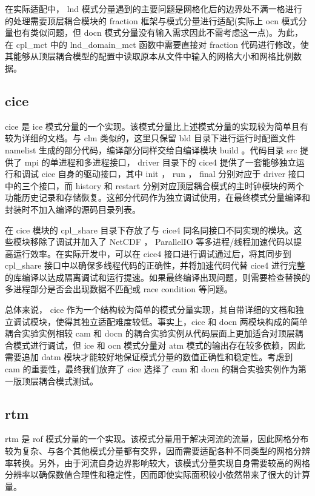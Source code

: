 在实际适配中， lnd 模式分量遇到的主要问题是网格化后的边界处不满一格进行的处理需要顶层耦合模块的 fraction 框架与模式分量进行适配(实际上 ocn 模式分量也有类似问题，但 docn 模式分量没有输入需求因此不需考虑这一点)。为此，在 cpl\_mct 中的 lnd\_domain\_mct 函数中需要直接对 fraction 代码进行修改，使其能够从顶层耦合模型的配置中读取原本从文件中输入的网格大小和网格比例数据。

\subsection{cice}

cice 是 ice 模式分量的一个实现。该模式分量比上述模式分量的实现较为简单且有较为详细的文档。与 clm 类似的，这里只保留 bld 目录下进行运行时配置文件 namelist 生成的部分代码，编译部分同样交给自编译模块 build 。代码目录 src 提供了 mpi 的单进程和多进程接口， driver 目录下的 cice4 提供了一套能够独立运行和调试 cice 自身的驱动接口，其中 init ， run ， final 分别对应于 driver 接口中的三个接口，而 history 和 restart 分别对应顶层耦合模式的主时钟模块的两个功能历史记录和存储恢复。这部分代码作为独立调试使用，在最终模式分量编译和封装时不加入编译的源码目录列表。

在 cice 模块的 cpl\_share 目录下存放了与 cice4 同名同接口不同实现的模块。这些模块移除了调试并加入了 NetCDF ， ParallelIO 等多进程/线程加速代码以提高运行效率。在实际开发中，可以在 cice4 接口进行调试通过后，将其同步到 cpl\_share 接口中以确保多线程代码的正确性，并将加速代码代替 cice4 进行完整的库编译以达成隔离调试和运行提速。如果最终编译出现问题，则需要检查替换的多进程部分是否会出现数据不匹配或 race condition 等问题。

总体来说， cice 作为一个结构较为简单的模式分量实现，其自带详细的文档和独立调试模块，使得其独立适配难度较低。事实上，cice 和 docn 两模块构成的简单耦合实验实例相较 cam 和 docn 的耦合实验实例从代码层面上更加适合对顶层耦合模式进行调试，但 ice 和 ocn 模式分量对 atm 模式的输出存在较多依赖，因此需要追加 datm 模块才能较好地保证模式分量的数值正确性和稳定性。考虑到 cam 的重要性，最终我们放弃了 cice 选择了 cam 和 docn 的耦合实验实例作为第一版顶层耦合模式测试。

\subsection{rtm}

rtm 是 rof 模式分量的一个实现。该模式分量用于解决河流的流量，因此网格分布较为复杂、与各个其他模式分量都有交界，因而需要适配各种不同类型的网格分辨率转换。另外，由于河流自身边界影响较大，该模式分量实现自身需要较高的网格分辨率以确保数值合理性和稳定性，因而即使实际面积较小依然带来了很大的计算量。

